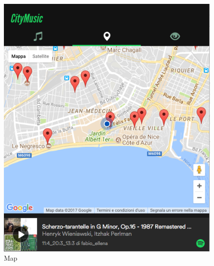 \documentclass[paper=a4, fontsize=11pt]{scrartcl}
\begin{document}
\begin{figure}[!htb]
\begin{minipage}[t]{0.45\textwidth}
\includegraphics[width=\linewidth]{images/Map.png}
\caption{Map}
\label{fig:map}
\end{minipage}


\end{figure}
\end{document}
